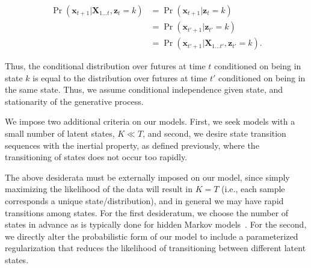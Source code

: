 \documentclass[letterpaper]{article}
\begin{document}
\vspace{-0.5cm}
\begin{align*}
    \Pr(\mathbf{x}_{t+1}|\mathbf{X}_{1\ldots t}, \mathbf{z}_t = k) 
    &= \Pr(\mathbf{x}_{t+1}| \mathbf{z}_t = k) \\
    &= \Pr(\mathbf{x}_{t'+1}| \mathbf{z}_{t'} = k) \\
    &= \Pr(\mathbf{x}_{t'+1}| \mathbf{X}_{1\ldots t'}, \mathbf{z}_{t'} = k).
\end{align*}
\vspace{-0.1cm}

Thus, the conditional distribution over futures at time $t$ conditioned on being
in state $k$ is equal to the distribution over futures at time $t'$ conditioned
on being in the same state. Thus, we assume conditional independence given
state, and stationarity of the generative process.

We impose two additional criteria on our models. First, we seek models
with a small number of latent states, $K \ll T$, and second, we desire state
transition sequences with the inertial property, as defined previously, where 
the transitioning of states does not occur too rapidly. 

The above desiderata must be externally imposed on our model, since simply
maximizing the likelihood of the data will result in $K = T$ (i.e., each sample
corresponds a unique state/distribution), and in general we may have rapid
transitions among states. For the first desideratum,  we choose the number of
states in advance as is typically done for hidden Markov
models~\cite{rabiner1989tutorial}. For the second, we directly alter the
probabilistic form of our model to include a parameterized regularization that
reduces the likelihood of transitioning between different latent states.

%
%
\vspace{-0.1cm}
\end{document}
